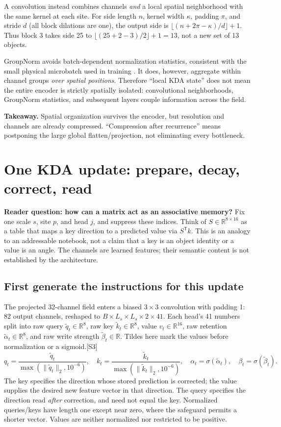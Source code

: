 \documentclass[10pt,letterpaper]{article}
\newcommand{\R}{\mathbb{R}}
\newcommand{\src}[1]{\textcolor{accent}{\textsf{[#1]}}}
\newcommand{\takeaway}[1]{\par\smallskip\noindent\textbf{Takeaway.} #1}
\newcommand{\psection}[1]{\clearpage\section{#1}}
\begin{document}
A convolution instead combines channels \emph{and} a local spatial neighborhood with the same kernel at each site. For side length $n$, kernel width $\kappa$, padding $\pi$, and stride $d$ (all block dilations are one), the output side is $\lfloor(n+2\pi-\kappa)/d\rfloor+1$. Thus block 3 takes side 25 to $\lfloor(25+2-3)/2\rfloor+1=13$, not a new set of 13 objects.

GroupNorm avoids batch-dependent normalization statistics, consistent with the small physical microbatch used in training \cite{gn}. It does, however, aggregate within channel groups \emph{over spatial positions}. Therefore ``local KDA state'' does not mean the entire encoder is strictly spatially isolated: convolutional neighborhoods, GroupNorm statistics, and subsequent layers couple information across the field.
\takeaway{Spatial organization survives the encoder, but resolution and channels are already compressed. ``Compression after recurrence'' means postponing the large global flatten/projection, not eliminating every bottleneck.}

\psection{One KDA update: prepare, decay, correct, read}
\textbf{Reader question: how can a matrix act as an associative memory?}
Fix one scale $s$, site $p$, and head $j$, and suppress these indices. Think of $S\in\R^{8\times16}$ as a table that maps a key direction to a predicted value via $S^{\mathsf T}k$. This is an analogy to an addressable notebook, not a claim that a key is an object identity or a value is an angle. The channels are learned features; their semantic content is not established by the architecture.

\subsection{First generate the instructions for this update}
The projected 32-channel field enters a biased $3\times3$ convolution with padding 1: 82 output channels, reshaped to $B\times L_s\times L_s\times2\times41$. Each head's 41 numbers split into raw query $\tilde q_t\in\R^8$, raw key $\tilde k_t\in\R^8$, value $v_t\in\R^{16}$, raw retention $\tilde\alpha_t\in\R^8$, and raw write strength $\tilde\beta_t\in\R$. Tildes here mark the values before normalization or a sigmoid.\src{S3}
\begin{equation}
q_t=\frac{\tilde q_t}{\max(\lVert\tilde q_t\rVert_2,10^{-6})},\quad
k_t=\frac{\tilde k_t}{\max(\lVert\tilde k_t\rVert_2,10^{-6})},\quad
\alpha_t=\sigma(\tilde\alpha_t),\quad\beta_t=\sigma(\tilde\beta_t).
\end{equation}
The key specifies the direction whose stored prediction is corrected; the value supplies the desired new feature vector in that direction. The query specifies the direction read \emph{after} correction, and need not equal the key. Normalized queries/keys have length one except near zero, where the safeguard permits a shorter vector. Values are neither normalized nor restricted to be positive.
\end{document}
